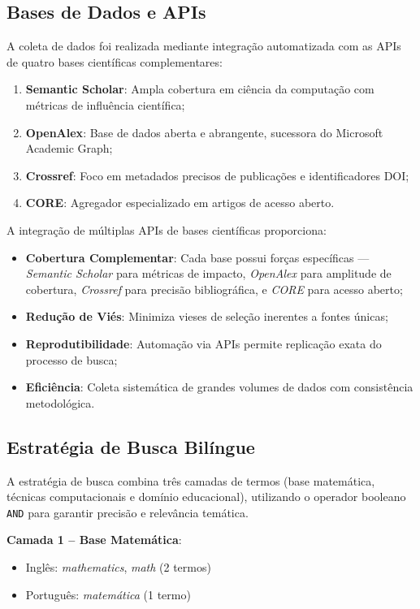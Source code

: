 \subsection{Bases de Dados e APIs}

A coleta de dados foi realizada mediante integração automatizada com as APIs de quatro bases científicas complementares:

\begin{enumerate}
    \item \textbf{Semantic Scholar}: Ampla cobertura em ciência da computação com métricas de influência científica;
    \item \textbf{OpenAlex}: Base de dados aberta e abrangente, sucessora do Microsoft Academic Graph;
    \item \textbf{Crossref}: Foco em metadados precisos de publicações e identificadores DOI;
    \item \textbf{CORE}: Agregador especializado em artigos de acesso aberto.
\end{enumerate}

A integração de múltiplas APIs de bases científicas proporciona:

\begin{itemize}
    \item \textbf{Cobertura Complementar}: Cada base possui forças específicas --- \textit{Semantic Scholar} para métricas de impacto, \textit{OpenAlex} para amplitude de cobertura, \textit{Crossref} para precisão bibliográfica, e \textit{CORE} para acesso aberto;
    \item \textbf{Redução de Viés}: Minimiza vieses de seleção inerentes a fontes únicas;
    \item \textbf{Reprodutibilidade}: Automação via APIs permite replicação exata do processo de busca;
    \item \textbf{Eficiência}: Coleta sistemática de grandes volumes de dados com consistência metodológica.
\end{itemize}

\subsection{Estratégia de Busca Bilíngue}

A estratégia de busca combina três camadas de termos (base matemática, técnicas computacionais e domínio educacional), utilizando o operador booleano \texttt{AND} para garantir precisão e relevância temática.

\textbf{Camada 1 -- Base Matemática}:
\begin{itemize}
    \item Inglês: \textit{mathematics}, \textit{math} (2 termos)
    \item Português: \textit{matemática} (1 termo)
\end{itemize}

